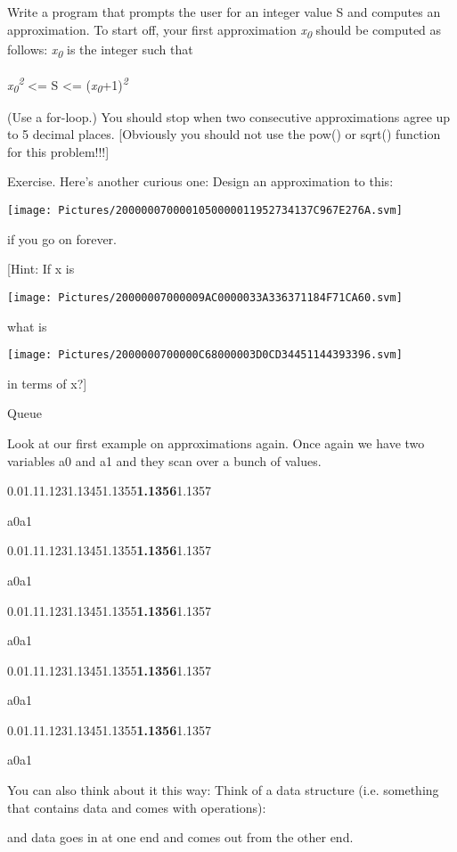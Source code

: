 \documentclass[
]{article}
\begin{document}
Write a program that prompts the user for an integer value S and
computes an approximation. To start off, your first approximation
\emph{x}\textsubscript{\emph{0}} should be computed as follows:
\emph{x}\textsubscript{\emph{0 }}is the integer such that

\emph{x}\textsubscript{\emph{0}}\textsuperscript{\emph{2}}\textsubscript{\emph{
}}\textless= S \textless=
(\emph{x}\textsubscript{\emph{0}}+1)\textsuperscript{\emph{2}}

(Use a for-loop.) You should stop when two consecutive approximations
agree up to 5 decimal places. {[}Obviously you should not use the pow()
or sqrt() function for this problem!!!{]}

Exercise. Here's another curious one: Design an approximation to this:

\texttt{[image: Pictures/2000000700001050000011952734137C967E276A.svm]}

if you go on forever.

{[}Hint: If x is

\texttt{[image: Pictures/20000007000009AC0000033A336371184F71CA60.svm]}

what is

\texttt{[image: Pictures/2000000700000C68000003D0CD34451144393396.svm]}

in terms of x?{]}

Queue

Look at our first example on approximations again. Once again we have
two variables a0 and a1 and they scan over a bunch of values.

0.01.11.1231.13451.1355\textbf{1.1356}1.1357

a0a1

0.01.11.1231.13451.1355\textbf{1.1356}1.1357

a0a1

0.01.11.1231.13451.1355\textbf{1.1356}1.1357

a0a1

0.01.11.1231.13451.1355\textbf{1.1356}1.1357

a0a1

0.01.11.1231.13451.1355\textbf{1.1356}1.1357

a0a1

You can also think about it this way: Think of a data structure (i.e.
something that contains data and comes with operations):

and data goes in at one end and comes out from the other end.
\end{document}
